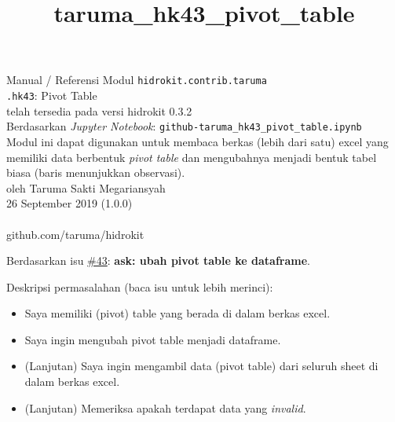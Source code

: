 \documentclass[11pt]{article}
\title{taruma\_hk43\_pivot\_table}
\providecommand{\tightlist}{%
      \setlength{\itemsep}{0pt}\setlength{\parskip}{0pt}}
\begin{document}
  
	\begin{titlepage}
		\vspace*{\fill}
		\begin{center}
 		\normalsize Manual / Referensi Modul \texttt{hidrokit.contrib.taruma}\\
		\huge \texttt{.hk43}: Pivot Table\\ 
		\small telah tersedia pada versi hidrokit 0.3.2 \\[0.2cm]
      	\small Berdasarkan \emph{Jupyter Notebook}: \texttt{github-taruma\_hk43\_pivot\_table.ipynb} \\[0.5cm]
      	\small Modul ini dapat digunakan untuk membaca berkas (lebih dari satu) excel yang memiliki data berbentuk \emph{pivot table} dan mengubahnya menjadi bentuk tabel biasa (baris menunjukkan observasi). \\[0.5cm]
		\normalsize oleh Taruma Sakti Megariansyah\\[0.5cm]
      	\normalsize 26 September 2019 (1.0.0)\\[1cm]
    	\\
      	\normalsize github.com/taruma/hidrokit
		\end{center}
    	\vspace*{\fill}
	\end{titlepage}
    
    

    
    

    Berdasarkan isu
\href{https://github.com/taruma/hidrokit/issues/43}{\#43}: \textbf{ask:
ubah pivot table ke dataframe}.

Deskripsi permasalahan (baca isu untuk lebih merinci):

\begin{itemize}
\tightlist
\item
  Saya memiliki (pivot) table yang berada di dalam berkas excel.
\item
  Saya ingin mengubah pivot table menjadi dataframe.
\item
  (Lanjutan) Saya ingin mengambil data (pivot table) dari seluruh sheet
  di dalam berkas excel.
\item
  (Lanjutan) Memeriksa apakah terdapat data yang \emph{invalid}.
\end{itemize}
\end{document}
